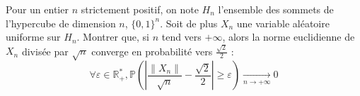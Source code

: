 \begin{exer}
Pour un entier $n$ strictement positif, on note $H_n$ l'ensemble des sommets de l'hypercube de dimension $n$, $\{0,1\}^n$. %
Soit de plus $X_n$ une variable al\'eatoire uniforme sur $H_n$. Montrer que, si $n$ tend vers $+\infty$, %
alors la norme euclidienne de $X_n$ divisée par $\sqrt{n}$ converge en probabilit\'e vers $\frac{\sqrt{2}}{2}$ :
\[\forall\varepsilon\in\mathbb{R}_+^{\ast},\mathbb{P}\left(\left|\frac{\|X_n\|}{\sqrt{n}}-\frac{\sqrt{2}}{2}\right|\geq\varepsilon\right)\underset{n\rightarrow +\infty}{\longrightarrow}0\]
\end{exer}